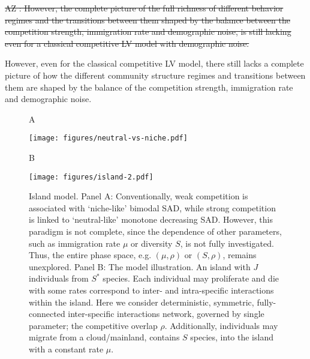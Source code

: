 \documentclass[9pt,twocolumn,twoside,lineno]{pnas-new}
\begin{document}
\st{ AZ : However, the complete picture of the full richness of different behavior regimes and the transitions between them shaped by the balance between the competition strength, immigration rate and demographic noise, is still lacking even for a classical competitive LV model with demographic noise.}

However, even for the classical competitive LV model, there still lacks a complete picture of how the different community structure regimes and transitions between them are shaped by the balance of the competition strength, immigration rate and demographic noise.

\begin{figure}[t!]
   \begin{flushleft}
        A
   \end{flushleft}
    \texttt{[image: figures/neutral-vs-niche.pdf]}
    \begin{flushleft}
        B
   \end{flushleft}
    \texttt{[image: figures/island-2.pdf]}
    \caption{Island model.  Panel A: Conventionally, weak competition is associated with `niche-like' bimodal SAD, while strong competition is linked to `neutral-like' monotone decreasing SAD. However, this paradigm is not complete, since the dependence of other parameters, such as immigration rate $\mu$ or diversity $S$, is not fully investigated. Thus, the entire phase space, e.g. $(\mu, \rho)$ or $(S, \rho)$,  remains unexplored. Panel B: The model illustration. An island with $J$ individuals from $S^*$ species.  Each individual may proliferate and die with some rates correspond to inter- and intra-specific interactions within the island. Here we consider deterministic, symmetric, fully-connected inter-specific interactions network, governed by single parameter; the competitive overlap $\rho$. Additionally, individuals may migrate from a cloud/mainland, contains $S$ species, into the island with a constant rate $\mu$.       }
    \label{fig:fig1}
\end{figure}
\end{document}

